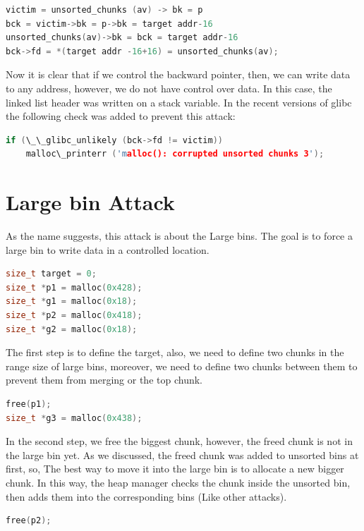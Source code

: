 \documentclass{masterthesis}
\newcommand*\libc{glibc}
\begin{document}
\begin{lstlisting}[language=c,frame=tlrb]
victim = unsorted_chunks (av) -> bk = p
bck = victim->bk = p->bk = target addr-16
unsorted_chunks(av)->bk = bck = target addr-16
bck->fd = *(target addr -16+16) = unsorted_chunks(av);
\end{lstlisting}

Now it is clear that if we control the backward pointer, then, we can write data to any address, however, we do not have control over data. In this case, the linked list header was written on a stack variable. In the recent versions of \libc{} the following check was added to prevent this attack:

\begin{lstlisting}[language=c,frame=tlrb]
if (\_\_glibc_unlikely (bck->fd != victim))
	malloc\_printerr ('malloc(): corrupted unsorted chunks 3');
\end{lstlisting}

\section{Large bin Attack}

As the name suggests, this attack is about the Large bins. The goal is to force a large bin to write data in a controlled location.

\begin{lstlisting}[language=c,frame=tlrb]
size_t target = 0;
size_t *p1 = malloc(0x428);
size_t *g1 = malloc(0x18);
size_t *p2 = malloc(0x418);
size_t *g2 = malloc(0x18);
\end{lstlisting}

The first step is to define the target, also, we need to define two chunks in the range size of large bins, moreover, we need to define two chunks between them to prevent them from merging or the top chunk. 

\begin{lstlisting}[language=c,frame=tlrb]
free(p1);
size_t *g3 = malloc(0x438);
\end{lstlisting}

In the second step, we free the biggest chunk, however, the freed chunk is not in the large bin yet. As we discussed, the freed chunk was added to unsorted bins at first, so, The best way to move it into the large bin is to allocate a new bigger chunk. In this way, the heap manager checks the chunk inside the unsorted bin, then adds them into the corresponding bins (Like other attacks).

\begin{lstlisting}[language=c,frame=tlrb]
free(p2);
\end{lstlisting}
\end{document}
